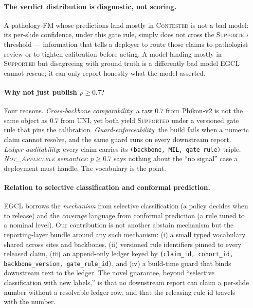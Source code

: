 \documentclass{article}
\newcommand{\SafeNum}[1]{#1}
\begin{document}
\paragraph{The verdict distribution is diagnostic, not scoring.} A pathology-FM whose predictions land mostly in \textsc{Contested} is not a bad model; its per-slide confidence, under this gate rule, simply does not cross the \textsc{Supported} threshold --- information that tells a deployer to route those claims to pathologist review or to tighten calibration before acting. A model landing mostly in \textsc{Supported} but disagreeing with ground truth is a differently bad model EGCL cannot rescue; it can only report honestly what the model asserted.

\paragraph{Why not just publish $p \ge \SafeNum{0.7}$?} Four reasons. \emph{Cross-backbone comparability}: a raw $\SafeNum{0.7}$ from Phikon-v2 is not the same object as $\SafeNum{0.7}$ from UNI, yet both yield \textsc{Supported} under a versioned gate rule that pins the calibration. \emph{Guard-enforceability}: the build fails when a numeric claim cannot resolve, and the same guard runs on every downstream report. \emph{Ledger auditability}: every claim carries its \texttt{(backbone, MIL, gate\_rule)} triple. \emph{\textsc{Not\_Applicable} semantics}: $p \ge \SafeNum{0.7}$ says nothing about the ``no signal'' case a deployment must handle. The vocabulary is the point.

\paragraph{Relation to selective classification and conformal prediction.} EGCL borrows the \emph{mechanism} from selective classification (a policy decides when to release) and the \emph{coverage} language from conformal prediction (a rule tuned to a nominal level). Our contribution is not another abstain mechanism but the reporting-layer bundle around any such mechanism: (i) a small typed vocabulary shared across sites and backbones, (ii) versioned rule identifiers pinned to every released claim, (iii) an append-only ledger keyed by \texttt{(claim\_id, cohort\_id, backbone\_version, gate\_rule\_id)}, and (iv) a build-time guard that binds downstream text to the ledger. The novel guarantee, beyond ``selective classification with new labels,'' is that no downstream report can claim a per-slide number without a resolvable ledger row, and that the releasing rule id travels with the number.
\end{document}
